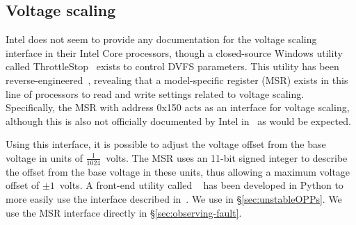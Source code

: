 \subsection{Voltage scaling}
\label{sec:undervolt}

Intel does not seem to provide any documentation for the voltage
scaling interface in their Intel Core processors, though a closed-source
Windows utility called ThrottleStop~\cite{throttlestop} exists to control DVFS
parameters. This utility has been reverse-engineered~\cite{elersicDoc},
revealing that a model-specific register (MSR) exists in this line of processors
to read and write settings related to voltage scaling. Specifically, the MSR
with address 0x150 acts as an interface for voltage scaling, although this is
also not officially documented by Intel in~\cite[Vol. 4, §2.13]{intelDevManual}
as would be expected.

Using this interface, it is possible to adjust the voltage offset from the base
voltage in units of $\frac{1}{1024}$~volts. The MSR uses an 11-bit signed
integer to describe the offset from the base voltage in these units, thus
allowing a maximum voltage offset of $\pm{1}$~volts. A front-end utility called
~\cite{whewellUndervolt} has been developed in Python to more
easily use the interface described in~\cite{elersicDoc}. We use 
in §\ref{sec:unstableOPPs}. We use the MSR interface directly in §\ref{sec:observing-fault}.
